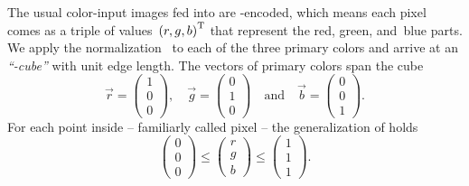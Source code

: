 The usual color-input images fed into \App{} are -encoded, which means each pixel
comes as a triple of values~${(r, g, b)}^{\mathrm{T}}$ that represent the red, green, and~blue
parts.  We apply the normalization~ to each of the three
primary colors and arrive at an \emph{``-cube''} with unit edge length.  The
vectors of primary colors span the cube
\[
  \vec{r} = \left(\begin{array}{c}1\\ 0\\ 0\end{array}\right),\quad
  \vec{g} = \left(\begin{array}{c}0\\ 1\\ 0\end{array}\right)\quad \mbox{and}\quad
  \vec{b} = \left(\begin{array}{c}0\\ 0\\ 1\end{array}\right).
\]
For each point inside -- familiarly called pixel -- the generalization of
 holds
\begin{equation}\label{equ:rgb-cube}
  \left(\begin{array}{c}0\\ 0\\ 0\end{array}\right) \leq
  \left(\begin{array}{c}r\\ g\\ b\end{array}\right) \leq
  \left(\begin{array}{c}1\\ 1\\ 1\end{array}\right).
\end{equation}

